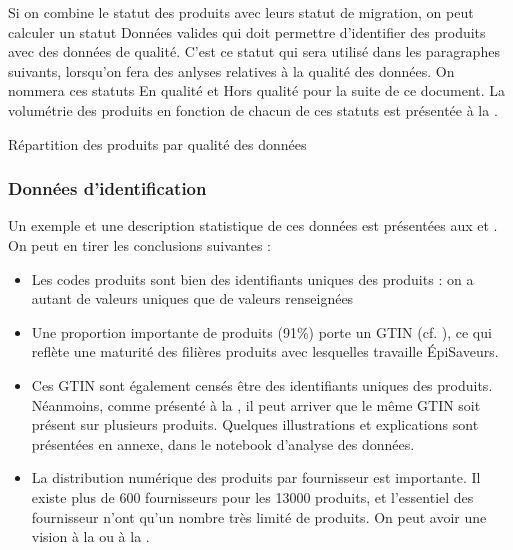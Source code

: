                 Si on combine le statut des produits avec leurs statut de migration, on peut calculer un statut \og Données valides \fg qui doit permettre d'identifier des produits avec des données de qualité.
                C'est ce statut qui sera utilisé dans les paragraphes suivants, lorsqu'on fera des anlyses relatives à la qualité des données.
                \label{def:en_qualite}
                On nommera ces statuts \og En qualité \fg et \og Hors qualité \fg pour la suite de ce document.
                La volumétrie des produits en fonction de chacun de ces statuts est présentée à la .

                \begin{table}[htbp]
                    \begin{center}
                    
                    \caption{Répartition des produits par \og qualité des données \fg}
                    \label{tbl:products_quality}
                    \end{center}
                \end{table}

                \subsubsection{Données d'identification}
                Un exemple et une description statistique de ces données est présentées aux  et .
                On peut en tirer les conclusions suivantes : 
                \begin{itemize}
                    \item Les codes produits sont bien des identifiants uniques des produits : on a autant de valeurs uniques que de valeurs renseignées
                    \item Une proportion importante de produits (91\%) porte un GTIN (cf. \cite{GS1_GTIN}), ce qui reflète une \og maturité \fg des filières produits avec lesquelles travaille \'{E}piSaveurs.
                    \item Ces GTIN sont également censés être des identifiants uniques des produits. Néanmoins, comme présenté à la , il peut arriver que le même GTIN soit présent sur plusieurs produits. Quelques illustrations et explications sont présentées en annexe, dans le notebook d'analyse des données.
                    \item La distribution numérique des produits par fournisseur est importante. Il existe plus de 600 fournisseurs pour les 13000 produits, et l'essentiel des fournisseur n'ont qu'un nombre très limité de produits. On peut avoir une vision à la  ou à la .
                \end{itemize}

